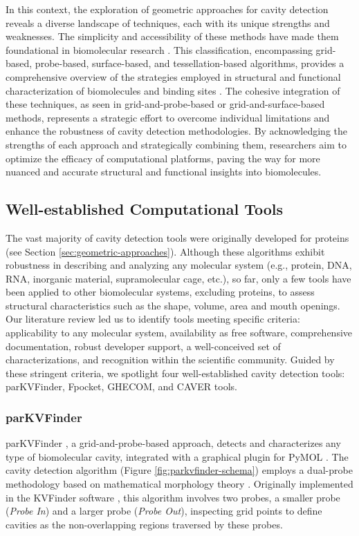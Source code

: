 \documentclass[Ingles]{phdthesis}
\def\eg{e.g.\onedot}
\begin{document}
In this context, the exploration of geometric approaches for cavity detection reveals a diverse landscape of techniques, each with its unique strengths and weaknesses. The simplicity and accessibility of these methods have made them foundational in biomolecular research \cite{henrich2010,simoes2017}. This classification, encompassing grid-based, probe-based, surface-based, and tessellation-based algorithms, provides a comprehensive overview of the strategies employed in structural and functional characterization of biomolecules and binding sites \cite{simoes2017}. The cohesive integration of these techniques, as seen in grid-and-probe-based or grid-and-surface-based methods, represents a strategic effort to overcome individual limitations and enhance the robustness of cavity detection methodologies. By acknowledging the strengths of each approach and strategically combining them, researchers aim to optimize the efficacy of computational platforms, paving the way for more nuanced and accurate structural and functional insights into biomolecules.

\subsection{Well-established Computational Tools \label{sec:computational-tools}}

The vast majority of cavity detection tools were originally developed for proteins (see Section \ref{sec:geometric-approaches}). Although these algorithms exhibit robustness in describing and analyzing any molecular system (\eg, protein, DNA, RNA, inorganic material, supramolecular cage, etc.), so far, only a few tools have been applied to other biomolecular systems, excluding proteins, to assess structural characteristics such as the shape, volume, area and mouth openings. Our literature review led us to identify tools meeting specific criteria: applicability to any molecular system, availability as free software, comprehensive documentation, robust developer support, a well-conceived set of characterizations, and recognition within the scientific community. Guided by these stringent criteria, we spotlight four well-established cavity detection tools: parKVFinder, Fpocket, \acs{GHECOM}, and CAVER tools.

\subsubsection{parKVFinder}

parKVFinder \cite{guerra2019,guerra2020}, a grid-and-probe-based approach, detects and characterizes any type of biomolecular cavity, integrated with a graphical plugin for PyMOL \cite{pymol}. The cavity detection algorithm (Figure \ref{fig:parkvfinder-schema}) employs a dual-probe methodology based on mathematical morphology theory \cite{matheron1974,serra1982}. Originally implemented in the KVFinder software \cite{oliveira2014}, this algorithm involves two probes, a smaller probe (\textit{Probe In}) and a larger probe (\textit{Probe Out}), inspecting grid points to define cavities as the non-overlapping regions traversed by these probes.
\end{document}
